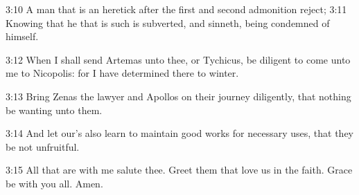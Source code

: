 3:10 A man that is an heretick after the first and second admonition reject; 3:11 Knowing that he that is such is subverted, and sinneth, being condemned of himself.

3:12 When I shall send Artemas unto thee, or Tychicus, be diligent to come unto me to Nicopolis: for I have determined there to winter.

3:13 Bring Zenas the lawyer and Apollos on their journey diligently, that nothing be wanting unto them.

3:14 And let our's also learn to maintain good works for necessary uses, that they be not unfruitful.

3:15 All that are with me salute thee. Greet them that love us in the faith. Grace be with you all. Amen.

